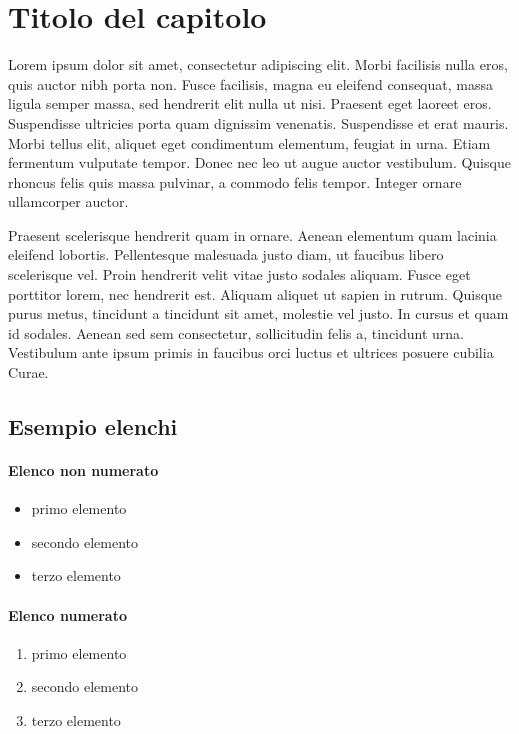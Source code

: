
\chapter{Titolo del capitolo}
Lorem ipsum dolor sit amet, consectetur adipiscing elit. Morbi facilisis nulla eros, quis auctor nibh porta non. Fusce facilisis, magna eu eleifend consequat, massa ligula semper massa, sed hendrerit elit nulla ut nisi. Praesent eget laoreet eros. Suspendisse ultricies porta quam dignissim venenatis. Suspendisse et erat mauris. Morbi tellus elit, aliquet eget condimentum elementum, feugiat in urna. Etiam fermentum vulputate tempor. Donec nec leo ut augue auctor vestibulum. Quisque rhoncus felis quis massa pulvinar, a commodo felis tempor. Integer ornare ullamcorper auctor.

Praesent scelerisque hendrerit quam in ornare. Aenean elementum quam lacinia eleifend lobortis. Pellentesque malesuada justo diam, ut faucibus libero scelerisque vel. Proin hendrerit velit vitae justo sodales aliquam. Fusce eget porttitor lorem, nec hendrerit est. Aliquam aliquet ut sapien in rutrum. Quisque purus metus, tincidunt a tincidunt sit amet, molestie vel justo. In cursus et quam id sodales. Aenean sed sem consectetur, sollicitudin felis a, tincidunt urna. Vestibulum ante ipsum primis in faucibus orci luctus et ultrices posuere cubilia Curae.

\section{Esempio elenchi}
\subsubsection{Elenco non numerato}
\begin{itemize}
	\item primo elemento
	\item secondo elemento
	\item terzo elemento 
\end{itemize}


\subsubsection{Elenco numerato}
\begin{enumerate}
	\item primo elemento
	\item secondo elemento
	\item terzo elemento 
\end{enumerate}

